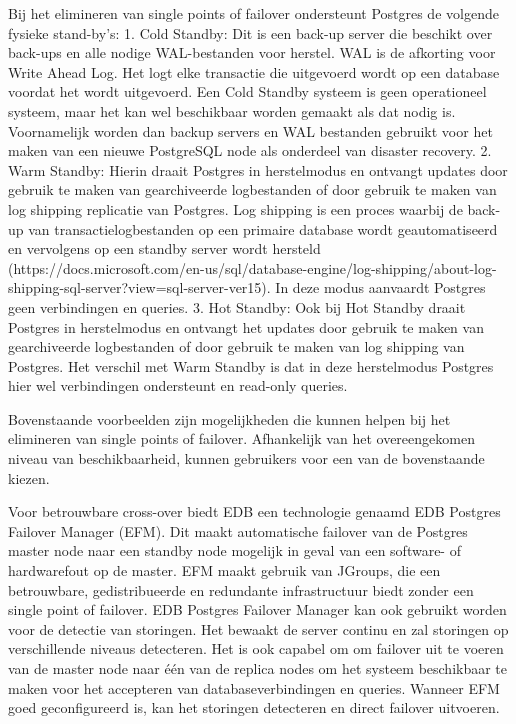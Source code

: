 Bij het elimineren van single points of failover ondersteunt Postgres de volgende fysieke stand-by's:
1. Cold Standby: Dit is een back-up server die beschikt over back-ups en alle nodige WAL-bestanden voor herstel. WAL is de afkorting voor Write Ahead Log. Het logt elke transactie die uitgevoerd wordt op een database voordat het wordt uitgevoerd. Een Cold Standby systeem is geen operationeel systeem, maar het kan wel beschikbaar worden gemaakt als dat nodig is. Voornamelijk worden dan backup servers en WAL bestanden gebruikt voor het maken van een nieuwe PostgreSQL node als onderdeel van disaster recovery.
2. Warm Standby: Hierin draait Postgres in herstelmodus en ontvangt updates door gebruik te maken van gearchiveerde logbestanden of door gebruik te maken van log shipping replicatie van Postgres. Log shipping is een proces waarbij de back-up van transactielogbestanden op een primaire database wordt geautomatiseerd en vervolgens op een standby server wordt hersteld (https://docs.microsoft.com/en-us/sql/database-engine/log-shipping/about-log-shipping-sql-server?view=sql-server-ver15). In deze modus aanvaardt Postgres geen verbindingen en queries.
3. Hot Standby: Ook bij Hot Standby draait Postgres in herstelmodus en ontvangt het updates door gebruik te maken van gearchiveerde logbestanden of door gebruik te maken van log shipping van Postgres. Het verschil met Warm Standby is dat in deze herstelmodus Postgres hier wel verbindingen ondersteunt en read-only queries.

Bovenstaande voorbeelden zijn mogelijkheden die kunnen helpen bij het elimineren van single points of failover. Afhankelijk van het overeengekomen niveau van beschikbaarheid, kunnen gebruikers voor een van de bovenstaande kiezen.

Voor betrouwbare cross-over biedt EDB een technologie genaamd EDB Postgres Failover Manager (EFM). Dit maakt automatische failover van de Postgres master node naar een standby node mogelijk in geval van een software- of hardwarefout op de master. EFM maakt gebruik van JGroups, die een betrouwbare, gedistribueerde en redundante infrastructuur biedt zonder een single point of failover.
EDB Postgres Failover Manager kan ook gebruikt worden voor de detectie van storingen. Het bewaakt de server continu en zal storingen op verschillende niveaus detecteren. Het is ook capabel om om failover uit te voeren van de master node naar één van de replica nodes om het systeem beschikbaar te maken voor het accepteren van databaseverbindingen en queries. Wanneer EFM goed geconfigureerd is, kan het storingen detecteren en direct failover uitvoeren.

